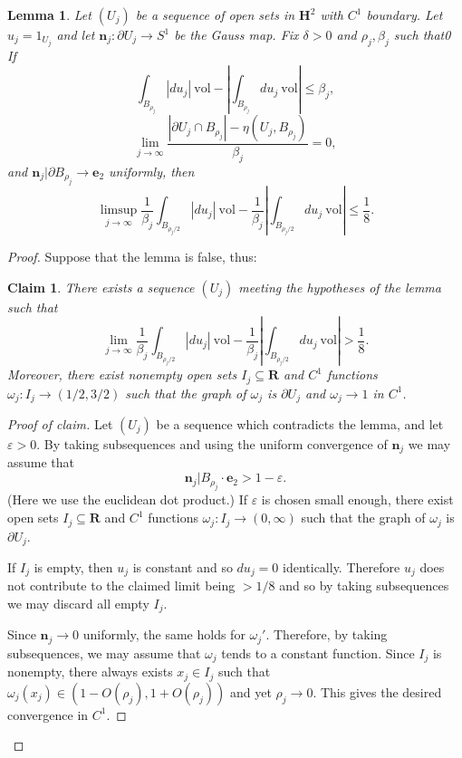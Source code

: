 \documentclass[reqno,12pt,letterpaper]{amsart}
\newcommand{\RR}{\mathbf{R}}
\newcommand{\Hyp}{\mathbf H}
\newcommand{\evect}{\mathbf e}
\newcommand{\normal}{\mathbf n}
\newcommand{\vol}{\mathrm{vol}}
\newtheorem{lemma}[theorem]{Lemma}
\newtheorem{claim}[theorem]{Claim}
\theoremstyle{definition}
\numberwithin{equation}{section}
\begin{document}
\begin{lemma}
Let $(U_j)$ be a sequence of open sets in $\Hyp^2$ with $C^1$ boundary.
Let $u_j = 1_{U_j}$ and let $\normal_j: \partial U_j \to S^1$ be the Gauss map.
Fix $\delta > 0$ and $\rho_j, \beta_j$ such that0
If
$$\int_{B_{\rho_j}} |du_j| ~\vol - \left|\int_{B_{\rho_j}} du_j ~\vol\right| \leq \beta_j,$$
$$\lim_{j \to \infty} \frac{|\partial U_j \cap B_{\rho_j}| - \eta(U_j, B_{\rho_j})}{\beta_j} = 0,$$
and $\normal_j|\partial B_{\rho_j} \to \evect_2$ uniformly,
then
$$\limsup_{j \to \infty} \frac{1}{\beta_j} \int_{B_{\rho_j/2}} |du_j| ~\vol - \frac{1}{\beta_j}\left|\int_{B_{\rho_j/2}} du_j ~\vol\right| \leq \frac{1}{8}.$$
\end{lemma}
\begin{proof}
Suppose that the lemma is false, thus:

\begin{claim}
There exists a sequence $(U_j)$ meeting the hypotheses of the lemma such that
$$\lim_{j \to \infty} \frac{1}{\beta_j} \int_{B_{\rho_j/2}} |du_j| ~\vol - \frac{1}{\beta_j}\left|\int_{B_{\rho_j/2}} du_j ~\vol\right| > \frac{1}{8}.$$
Moreover, there exist nonempty open sets $I_j \subseteq \RR$ and $C^1$ functions $\omega_j: I_j \to (1/2, 3/2)$ such that the graph of $\omega_j$ is $\partial U_j$ and $\omega_j \to 1$ in $C^1$.
\end{claim}
\begin{proof}[Proof of claim]
Let $(U_j)$ be a sequence which contradicts the lemma, and let $\varepsilon > 0$.
By taking subsequences and using the uniform convergence of $\normal_j$ we may assume that
$$\normal_j|B_{\rho_j} \cdot \evect_2 > 1 - \varepsilon.$$
(Here we use the euclidean dot product.)
If $\varepsilon$ is chosen small enough, there exist open sets $I_j \subseteq \RR$ and $C^1$ functions $\omega_j: I_j \to (0, \infty)$ such that the graph of $\omega_j$ is $\partial U_j$.

If $I_j$ is empty, then $u_j$ is constant and so $du_j = 0$ identically.
Therefore $u_j$ does not contribute to the claimed limit being $> 1/8$ and so by taking subsequences we may discard all empty $I_j$.

Since $\normal_j \to 0$ uniformly, the same holds for $\omega_j'$.
Therefore, by taking subsequences, we may assume that $\omega_j$ tends to a constant function.
Since $I_j$ is nonempty, there always exists $x_j \in I_j$ such that $\omega_j(x_j) \in (1 - O(\rho_j), 1 + O(\rho_j))$ and yet $\rho_j \to 0$.
This gives the desired convergence in $C^1$.
\end{proof}


\end{proof}
\end{document}
